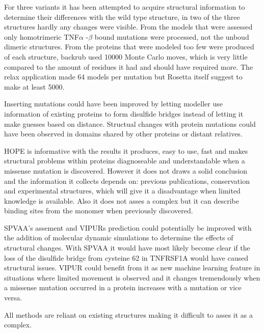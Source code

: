 For three variants it has been attempted to acquire structural information to determine their differences with the wild type structure, in two of the three structures hardly any changes were visible. From the models that were assessed only homotrimeric TNF$\alpha$ -$\beta$ bound mutations were processed, not the unboud dimeric structures. From the proteins that were modeled too few were produced of each structure, backrub used 10000 Monte Carlo moves, which is very little compared to the amount of residues it had and should have required more. The relax application made 64 models per mutation but Rosetta itself suggest to make at least 5000\cite{rosetta_commons_analyzing_nodate}.

Inserting mutations could have been improved by letting modeller use information of existing proteins to form disulfide bridges instead of letting it make guesses based on distance. Structual changes with protein mutations could have been observed in domains shared by other proteins or distant relatives.

HOPE is informative with the results it produces, easy to use, fast and makes structural problems within proteins diagnoseable and understandable when a missense mutation is discovered. However it does not draws a solid conclusion and the information it collects depends on: previous publications, conservation and experimental structures, which will give it a disadvantage when limited knowledge is available. Also it does not asses a complex but it can describe binding sites from the monomer when previously discovered.


SPVAA's assement and VIPURs prediction could potentially be improved with the addition of molecular dynamic simulations to determine the effects of structural changes. With SPVAA it would have most likely become clear if the loss of the disulfide bridge from cysteine 62 in TNFRSF1A would have caused structural issues. VIPUR could benefit from it as new machine learning feature in situations where limited movement is observed and it changes tremendously when a missense mutation occurred in a protein increases with a mutation or vice versa.



All methods are reliant on existing structures making it difficult to asses it as a complex.
